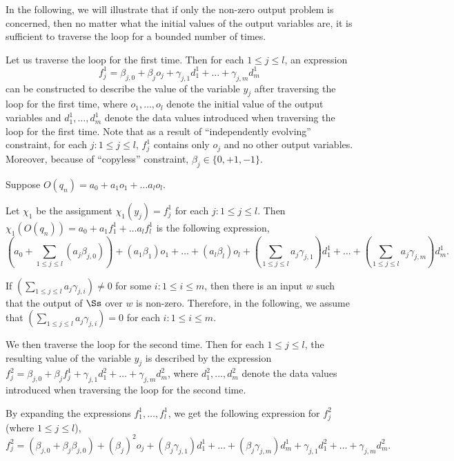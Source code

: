 In the following, we will illustrate that if only the non-zero output problem is concerned, then no matter what the initial values of the output variables are, it is sufficient to traverse the loop for a bounded number of times.


Let us traverse the loop for the first time. Then for each $1 \le j \le l$, an expression 
\[f^1_{j} = \beta_{j,0} + \beta_{j} o_{j} + \gamma_{j,1} d^1_1 + \dots + \gamma_{j,m} d^1_m\] 
can be constructed to describe the value of the variable $y_{j}$ after traversing the loop for the first time, where $o_1,\dots,o_l$ denote the initial value of the output variables and $d^1_1, \dots, d^1_m$ denote the data values introduced when traversing the loop for the first time. Note that as a result of ``independently evolving'' constraint, for each $j: 1 \le j \le l$, $f^1_{j}$ contains only $o_{j}$ and no other output variables. Moreover, because of ``copyless'' constraint, $\beta_j \in \{0,+1,-1\}$.

Suppose $O(q_n)=a_0 + a_1 o_1 + \dots a_l o_l$. 

Let $\chi_1$ be the assignment $\chi_1(y_j)=f^1_j$ for each $j: 1\le j \le l$.
Then $\chi_1(O(q_n)) = a_0+ a_1 f^1_1 + \dots a_l f^1_l$ is the following expression,
\[
(a_0 + \sum \limits_{1 \le j \le l} (a_j\beta_{j,0})) +  (a_1 \beta_1) o_1 + \dots + (a_l \beta_l) o_l + (\sum \limits_{1 \le j \le l} a_j \gamma_{j,1}) d^1_1 + \dots + (\sum \limits_{1 \le j \le l} a_j \gamma_{j,m}) d^1_m.
\]

If $(\sum \limits_{1 \le j \le l} a_j \gamma_{j,i}) \neq 0$ for some $i: 1 \le i \le m$, then there is an input $w$ such that the output of $\Ss$ over $w$ is non-zero. Therefore, in the following, we assume that $(\sum \limits_{1 \le j \le l} a_j \gamma_{j,i}) = 0$ for each $i: 1 \le i \le m$.

We then traverse the loop for the second time. Then for each $1 \le j \le l$,  the resulting value of the variable $y_{j}$ is described by the expression $f^2_{j} = \beta_{j,0} + \beta_{j} f^1_{j} + \gamma_{j,1} d^2_1 + \dots + \gamma_{j,m} d^2_m$, where $d^2_1, \dots, d^2_m$ denote the data values introduced when traversing the loop for the second time. 

By expanding the expressions $f^1_1,\dots, f^1_l$, we get the following expression for $f^2_{j}$ (where $1 \le j \le l$),
\[
f^2_{j} = (\beta_{j,0} + \beta_{j} \beta_{j,0}) + (\beta_{j})^2 o_{j} +
(\beta_{j}\gamma_{j,1}) d^1_1 +\dots + (\beta_{j}\gamma_{j,m}) d^1_m  + 
\gamma_{j,1} d^2_1 + \dots + \gamma_{j,m} d^2_m.
\]

